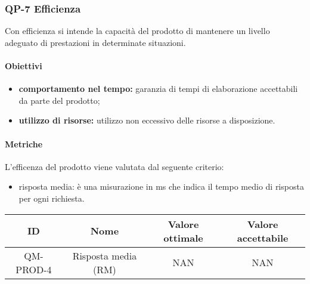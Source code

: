 \subsubsection{QP-7 Efficienza}
Con efficienza si intende la capacità del prodotto di mantenere un livello adeguato di prestazioni in determinate situazioni.
	\paragraph{Obiettivi}
		\begin{itemize}
			\item \textbf{comportamento nel tempo:} garanzia di tempi di elaborazione accettabili da parte del prodotto;
			\item \textbf{utilizzo di risorse:} utilizzo non eccessivo delle risorse a disposizione.
		\end{itemize}
	\paragraph{Metriche}
	L'efficenza del prodotto viene valutata dal seguente criterio:
	\begin{itemize}
		\item risposta media: è una misurazione in ms che indica il tempo medio di risposta per ogni richiesta.
	\end{itemize}
	\begin{center}
		\begin{tabular}{|c|c|c|c|}
			\hline
			ID & Nome & Valore ottimale & Valore accettabile \\
			\hline
			QM-PROD-4 & Risposta media (RM) & NAN & NAN \\
			\hline
		\end{tabular}
	\end{center}
